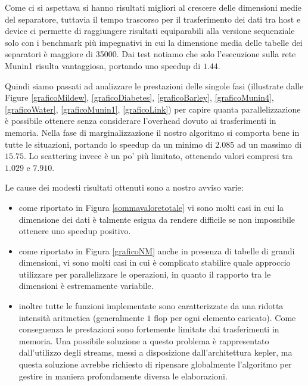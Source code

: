 \documentclass[a4paper]{article}   %
\begin{document}
Come ci si aspettava si hanno risultati migliori al crescere delle dimensioni medie del separatore, tuttavia il tempo trascorso per il trasferimento dei dati tra host e device ci permette di raggiungere risultati equiparabili alla versione sequenziale solo con i benchmark più impegnativi in cui la dimensione media delle tabelle dei separatori è maggiore di 35000. Dai test notiamo che solo l'esecuzione sulla rete Munin1 risulta vantaggiosa, portando uno speedup di $1.44$. %

Quindi siamo passati ad analizzare le prestazioni delle singole fasi (illustrate dalle Figure \ref{graficoMildew}, \ref{graficoDiabetes}, \ref{graficoBarley}, \ref{graficoMunin4}, \ref{graficoWater}, \ref{graficoMunin1}, \ref{graficoLink}) per capire quanta parallelizzazione è possibile ottenere senza considerare l'overhead dovuto ai trasferimenti in memoria.
Nella fase di marginalizzazione il nostro algoritmo si comporta bene in tutte le situazioni, portando lo speedup da un minimo di $2.085$ ad un massimo di $15.75$.
Lo scattering invece è un po' più limitato, ottenendo valori compresi tra $1.029$ e $7.910$.

Le cause dei modesti risultati ottenuti sono a nostro avviso varie:
\begin{itemize}
\item come riportato in Figura \ref{sommavaloretotale} vi sono molti casi in cui la dimensione dei dati è talmente esigua da rendere difficile se non impossibile ottenere uno speedup positivo. 
\item come riportato in Figura \ref{graficoNM} anche in presenza di tabelle di grandi dimensioni, vi sono molti casi in cui è complicato stabilire quale approccio utilizzare per parallelizzare le operazioni, in quanto il rapporto tra le dimensioni è estremamente variabile. %
\item inoltre tutte le funzioni implementate sono caratterizzate da una ridotta intensità aritmetica (generalmente $1$ flop per ogni elemento caricato). Come conseguenza le prestazioni sono fortemente limitate dai trasferimenti in memoria. Una possibile soluzione a questo problema è rappresentato dall'utilizzo degli streams, messi a disposizione dall'architettura kepler, ma questa soluzione avrebbe richiesto di ripensare globalmente l'algoritmo per gestire in maniera profondamente diversa le elaborazioni.
\end{itemize}
\end{document}
